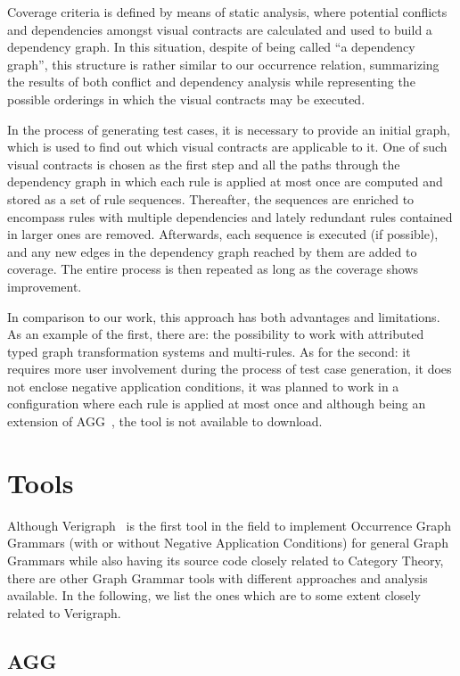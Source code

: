 Coverage criteria is defined by means of static analysis, where potential conflicts and dependencies amongst visual contracts are calculated and used to build a dependency graph. In this situation, despite of being called ``a dependency graph'', this structure is rather similar to our occurrence relation, summarizing the results of both conflict and dependency analysis while representing the possible orderings in which the visual contracts may be executed.

In the process of generating test cases, it is necessary to provide an initial graph, which is used to find out which visual contracts are applicable to it. One of such visual contracts is chosen as the first step and all the paths through the dependency graph in which each rule is applied at most once are computed and stored as a set of rule sequences. Thereafter, the sequences are enriched to encompass rules with multiple dependencies and lately redundant rules contained in larger ones are
removed. Afterwards, each sequence is executed (if possible), and any new edges in the dependency graph reached by them are added to coverage. The entire process is then repeated as long as the coverage shows improvement.

In comparison to our work, this approach has both advantages and limitations. As an example of the first, there are: the possibility to work with attributed typed graph transformation systems and multi-rules. As for the second: it requires more user involvement during the process of test case generation, it does not enclose negative application conditions, it was planned to work in a configuration where each rule is applied at most once and although being an extension of
AGG~\cite{Taentzer2000}, the tool is not available to download.

\section{Tools}

Although Verigraph~\cite{Costa2016, verigraph, Azzi2018} is the first tool in the field to implement Occurrence Graph Grammars (with or without Negative Application Conditions) for general Graph Grammars while also having its source code closely related to Category Theory, there are other Graph Grammar tools with different approaches and analysis available. In the following, we list the ones which are to some extent closely related to Verigraph.

\subsection{AGG}

